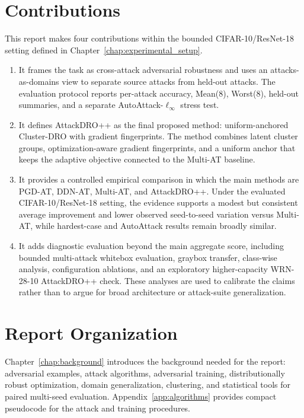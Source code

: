 \section{Contributions}

This report makes four contributions within the bounded CIFAR-10/ResNet-18
setting defined in Chapter~\ref{chap:experimental_setup}.

\begin{enumerate}
\item It frames the task as cross-attack adversarial robustness and uses an
attacks-as-domains view to separate source attacks from held-out attacks.  The
evaluation protocol reports per-attack accuracy, Mean(8), Worst(8), held-out
summaries, and a separate AutoAttack-\(\ell_\infty\) stress test.

\item It defines AttackDRO++ as the final proposed method: uniform-anchored
Cluster-DRO with gradient fingerprints.  The method combines latent cluster
groups, optimization-aware gradient fingerprints, and a uniform anchor that keeps
the adaptive objective connected to the Multi-AT baseline.

\item It provides a controlled empirical comparison in which the main methods are
PGD-AT, DDN-AT, Multi-AT, and AttackDRO++.  Under the evaluated CIFAR-10/ResNet-18
setting, the evidence supports a modest but consistent average improvement and
lower observed seed-to-seed variation versus Multi-AT, while hardest-case and
AutoAttack results remain broadly similar.

\item It adds diagnostic evaluation beyond the main aggregate score, including
bounded multi-attack whitebox evaluation, graybox transfer, class-wise analysis,
configuration ablations, and an exploratory higher-capacity WRN-28-10
AttackDRO++ check.  These analyses are used to calibrate the claims rather than
to argue for broad architecture or attack-suite generalization.
\end{enumerate}

\section{Report Organization}

Chapter~\ref{chap:background} introduces the background needed for the report:
adversarial examples, attack algorithms, adversarial training, distributionally
robust optimization, domain generalization, clustering, and statistical tools
for paired multi-seed evaluation.  Appendix~\ref{app:algorithms} provides compact
pseudocode for the attack and training procedures.


